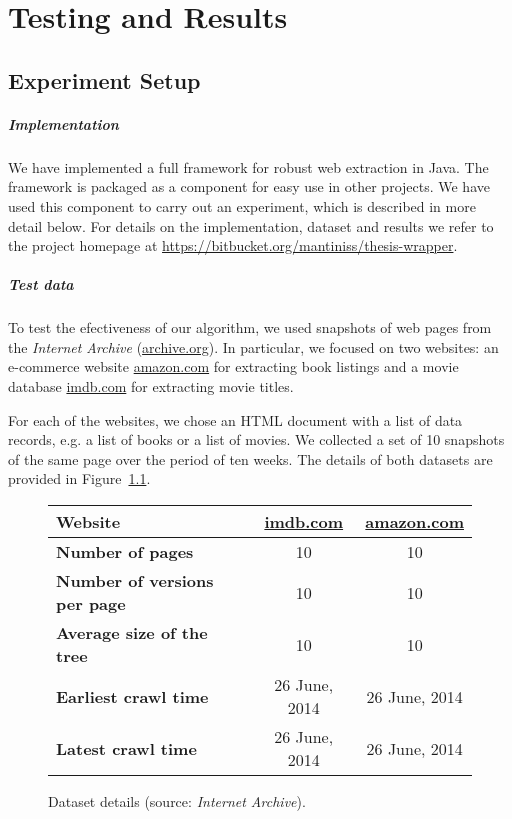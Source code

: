 \chapter{Testing and Results}


\section{Experiment Setup}

\paragraph{Implementation} We have implemented a full framework for robust web extraction in Java. The framework is packaged as a component for easy use in other projects. We have used this component to carry out an experiment, which is described in more detail below. For details on the implementation, dataset and results we refer to the project homepage at \url{https://bitbucket.org/mantiniss/thesis-wrapper}.

\paragraph{Test data} To test the efectiveness of our algorithm, we used snapshots of web pages from the \emph{Internet Archive} (\url{archive.org}). In particular, we focused on two websites: an e-commerce website \url{amazon.com} for extracting book listings and a movie database \url{imdb.com} for extracting movie titles.

For each of the websites, we chose an HTML document with a list of data records, e.g. a list of books or a list of movies. We collected a set of 10 snapshots of the same page over the period of ten weeks. The details of both datasets are provided in Figure~\ref{tbl:dataset}.

\begin{figure}[h]
	\centering
    \begin{tabularx}{\textwidth}{ | X | c | c | }
		\hline
		\textbf{Website} & \url{imdb.com} & \url{amazon.com} \\
		\hline
		\textbf{Number of pages} & 10 & 10 \\
		\hline
		\textbf{Number of versions per page} & 10 & 10 \\
		\hline
		\textbf{Average size of the tree} & 10 & 10 \\
		\hline
		\textbf{Earliest crawl time} & 26 June, 2014 & 26 June, 2014 \\
		\hline
		\textbf{Latest crawl time} & 26 June, 2014 & 26 June, 2014 \\
		\hline
    \end{tabularx}
	\caption{Dataset details (source: \emph{Internet Archive}).}
	\label{tbl:dataset}
\end{figure}

